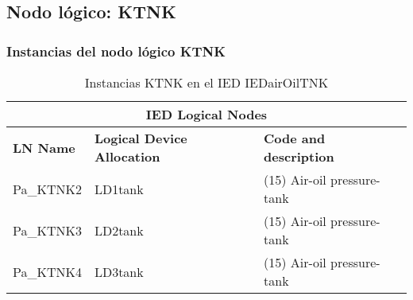 
\subsection{Nodo l\'ogico: 			 KTNK}

    \subsubsection{Instancias del nodo l\'ogico KTNK}
    \begin{table}[H]
    \begin{center}
    \begin{tabular}{|l|l|p{6.8cm}|}
            \hline
            \multicolumn{3}{|c|}{\cellcolor[gray]{0.8} \textbf{IED Logical Nodes} } \\
            \hline
            \textbf{LN Name} & \textbf{Logical Device Allocation} & \textbf{Code and description} \\
            \hline
            Pa\_KTNK2 & LD1tank & (15) Air-oil pressure-tank \\
            \hline
            Pa\_KTNK3 & LD2tank & (15) Air-oil pressure-tank \\
            \hline
            Pa\_KTNK4 & LD3tank & (15) Air-oil pressure-tank \\
            \hline
    \end{tabular}
    \caption{Instancias KTNK en el IED IEDairOilTNK}
    \label{table:lnInstKTNK_air_oil}
    \end{center}
    \end{table}
    
    
    
